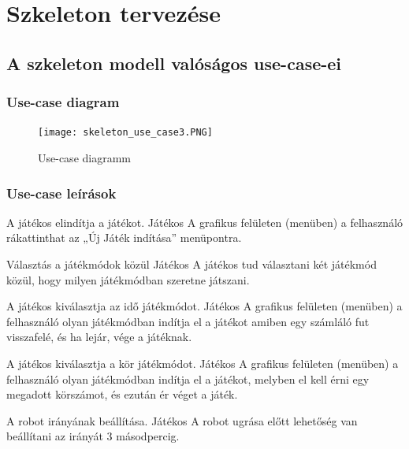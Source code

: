 %
\chapter{Szkeleton tervezése}

\thispagestyle{fancy}

\section{A szkeleton modell valóságos use-case-ei}

\subsection{Use-case diagram}

\begin{figure}[h]
\begin{center}
\texttt{[image: skeleton\_use\_case3.PNG]}
\caption{Use-case diagramm}
\label{fig:SzkeletonUseCase}
\end{center}
\end{figure}
\newpage

\subsection{Use-case leírások}

{A játékos elindítja a játékot.}
{Játékos}
{A grafikus felületen (menüben) a felhasználó rákattinthat az „Új Játék indítása” menüpontra.}

{Választás a játékmódok közül}
{Játékos}
{A játékos tud választani két játékmód közül, hogy milyen játékmódban szeretne játszani.}

{A játékos kiválasztja az idő játékmódot.}
{Játékos}
{A grafikus felületen (menüben) a felhasználó olyan játékmódban indítja el a játékot amiben egy számláló fut visszafelé, és ha lejár, vége a játéknak.}

{A játékos kiválasztja a kör játékmódot.}
{Játékos}
{A grafikus felületen (menüben) a felhasználó olyan játékmódban indítja el a játékot, melyben el kell érni egy megadott körszámot, és ezután ér véget a játék.}

{A robot irányának beállítása.}
{Játékos}
{A robot ugrása előtt lehetőség van beállítani az irányát 3 másodpercig.}

